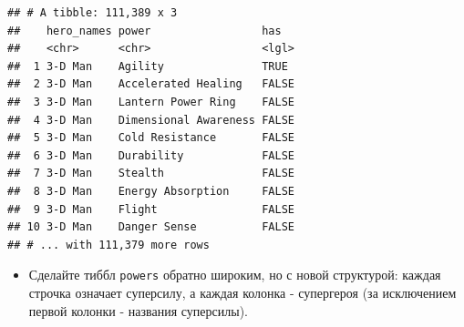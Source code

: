 \documentclass[]{book}
\newenvironment{Shaded}{\begin{snugshade}}{\end{snugshade}}
\newcommand{\KeywordTok}[1]{\textcolor[rgb]{0.13,0.29,0.53}{\textbf{#1}}}
\newcommand{\DataTypeTok}[1]{\textcolor[rgb]{0.13,0.29,0.53}{#1}}
\newcommand{\StringTok}[1]{\textcolor[rgb]{0.31,0.60,0.02}{#1}}
\newcommand{\OperatorTok}[1]{\textcolor[rgb]{0.81,0.36,0.00}{\textbf{#1}}}
\newcommand{\NormalTok}[1]{#1}
\providecommand{\tightlist}{%
  \setlength{\itemsep}{0pt}\setlength{\parskip}{0pt}}
\begin{document}
\begin{Shaded}
\end{Shaded}

\begin{verbatim}
## # A tibble: 111,389 x 3
##    hero_names power                 has  
##    <chr>      <chr>                 <lgl>
##  1 3-D Man    Agility               TRUE 
##  2 3-D Man    Accelerated Healing   FALSE
##  3 3-D Man    Lantern Power Ring    FALSE
##  4 3-D Man    Dimensional Awareness FALSE
##  5 3-D Man    Cold Resistance       FALSE
##  6 3-D Man    Durability            FALSE
##  7 3-D Man    Stealth               FALSE
##  8 3-D Man    Energy Absorption     FALSE
##  9 3-D Man    Flight                FALSE
## 10 3-D Man    Danger Sense          FALSE
## # ... with 111,379 more rows
\end{verbatim}

\begin{itemize}
\tightlist
\item
  Сделайте тиббл \texttt{powers} обратно широким, но с новой структурой:
  каждая строчка означает суперсилу, а каждая колонка - супергероя (за
  исключением первой колонки - названия суперсилы).
\end{itemize}

\begin{Shaded}
\end{Shaded}
\end{document}
